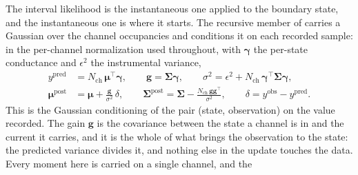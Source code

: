 The interval likelihood is the instantaneous one applied to the boundary state, and the
instantaneous one is where it starts. The recursive
member of \citet{moffatt2007estimation} carries a Gaussian over the channel occupancies and
conditions it on each recorded sample: in the per-channel normalization used throughout, with
$\bm{\gamma}$ the per-state conductance and $\epsilon^2$ the instrumental variance,
\begin{align}
  y^{\mathrm{pred}} &= N_{\mathrm{ch}}\,\bm{\mu}^\top\bm{\gamma},
  \qquad
  \mathbf{g} = \bm{\Sigma}\bm{\gamma},
  \qquad
  \sigma^2 = \epsilon^2 + N_{\mathrm{ch}}\,\bm{\gamma}^\top\bm{\Sigma}\bm{\gamma},
  \nonumber\\
  \bm{\mu}^{\mathrm{post}} &= \bm{\mu} + \frac{\mathbf{g}}{\sigma^2}\,\delta,
  \qquad
  \bm{\Sigma}^{\mathrm{post}} = \bm{\Sigma} - \frac{N_{\mathrm{ch}}\,\mathbf{g}\mathbf{g}^\top}{\sigma^2},
  \qquad
  \delta = y^{\mathrm{obs}} - y^{\mathrm{pred}}.
  \label{eq:macror}
\end{align}
This is the Gaussian conditioning of the pair (state, observation) on the value recorded. The
gain $\mathbf{g}$ is the covariance between the state a channel is in and the current it
carries, and it is the whole of what brings the observation to the state: the predicted
variance divides it, and nothing else in the update touches the data.
Every moment here is carried on a single channel, and the
